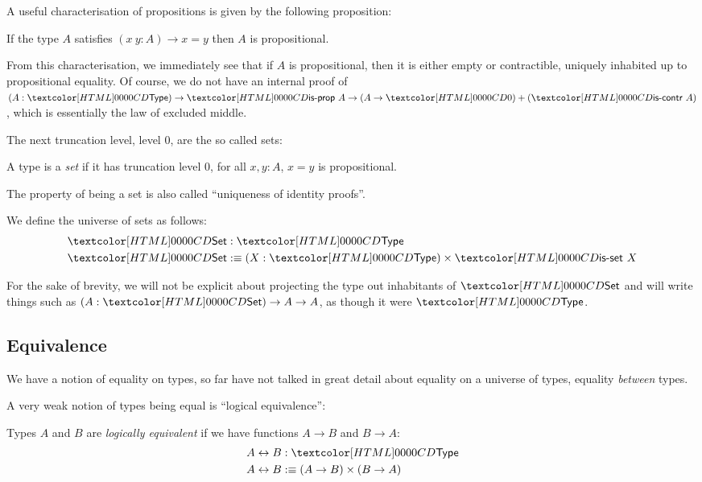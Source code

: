 A useful characterisation of propositions is given by the following
proposition:
\begin{proposition}
  If the type $A$ satisfies $(x\ y : A) \to x = y$ then $A$ is
  propositional.
\end{proposition}
From this characterisation, we immediately see that if $A$ is
propositional, then it is either empty or contractible, \ie uniquely
inhabited up to propositional equality. Of course, we do not have an
internal proof of
$(A : \Type) \to \isprop\ A \to (A \to \emptyty) + (\iscontr\ A)$,
which is essentially the law of excluded middle.

The next truncation level, level $0$, are the so called sets:
\begin{definition}
  A type is a \emph{set} if it has truncation level $0$, \ie for all
  $x, y : A$, $x = y$ is propositional.
\end{definition}
The property of being a set is also called ``uniqueness of identity
proofs''.
\begin{definition}
  We define the universe of sets as follows:
  \begin{align*}
    &\Set : \Type \\
    &\Set \ddefeq (X : \Type) \times \isset\ X
  \end{align*}
\end{definition}

For the sake of brevity, we will not be explicit about projecting the
type out inhabitants of $\Set$ and will write things such as
$(A : \Set) \to A \to A$, as though it were $\Type$.

\subsection{Equivalence}

We have a notion of equality on types, so far have not talked in great
detail about equality on a universe of types, \ie equality
\emph{between} types.

A very weak notion of types being equal is ``logical equivalence'':
\begin{definition}
  Types $A$ and $B$ are \emph{logically equivalent} if we have
  functions $A \to B$ and $B \to A$:
  \begin{align*}
    &A \logequiv B : \Type \\
    &A \logequiv B \ddefeq (A \to B) \times (B \to A)
  \end{align*}
\end{definition}

